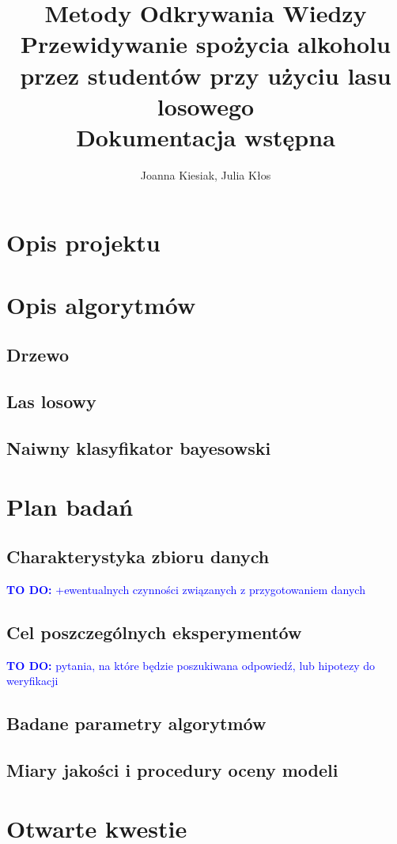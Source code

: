 \documentclass{article}
\title{{\normalfont Metody Odkrywania Wiedzy}\vspace{0.2cm} \\ 
Przewidywanie spożycia alkoholu przez studentów przy użyciu lasu losowego\\
\vspace{0.2cm}
\large{\normalfont Dokumentacja wstępna}}
\author{
Joanna Kiesiak, Julia Kłos\\

}
\newcommand{\todo}[1]{\textcolor{blue}{\textbf{TO DO:} #1}}
\begin{document}
\maketitle

\section{Opis projektu}

\section{Opis algorytmów}
\subsection{Drzewo}

\subsection{Las losowy}

\subsection{Naiwny klasyfikator bayesowski}

\section{Plan badań}
\subsection{Charakterystyka zbioru danych}
\todo{+ewentualnych czynności związanych z przygotowaniem danych}
\subsection{Cel poszczególnych eksperymentów}
\todo{pytania, na które będzie poszukiwana odpowiedź, lub hipotezy do weryfikacji}
\subsection{Badane parametry algorytmów}
\subsection{Miary jakości i procedury oceny modeli}
\section{Otwarte kwestie}


\end{document}
